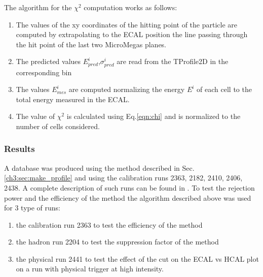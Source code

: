 The algorithm for the $\chi^2$ computation works as follows:
\begin{enumerate}
\item The values of the xy coordinates of the hitting point of the
  particle are computed by extrapolating to the ECAL position the line
  passing through the hit point of the last two MicroMegas planes.
\item The predicted values $E_{pred}^i$,$\sigma^{i}_{pred}$ are read from the TProfile2D in
  the corresponding bin
\item The values $E_{mes}^i$ are computed normalizing the energy $E^i$
  of each cell to the total energy measured in the ECAL.
\item The value of $\chi^2$ is calculated using Eq.\ref{eqn:chi} and is
  normalized to the number of cells considered.
\end{enumerate}

\subsubsection{Results}
\label{ch3:sec:chi2-result}

A database was produced using the method described in
Sec.\ref{ch3:sec:make_profile} and using the calibration runs 2363, 2182,
2410, 2406, 2438. A complete description of such runs can be found in
\cite{na64-runs}. To test the rejection power and the efficiency of the
method the algorithm described above was used for 3 type of runs:
\begin{enumerate}
\item the calibration run 2363 to test the efficiency of the method
\item the hadron run 2204 to test the suppression factor of the method
\item the physical run 2441 to test the effect of the cut on the ECAL
  vs HCAL plot on a run with physical trigger at high intensity.
\end{enumerate}

